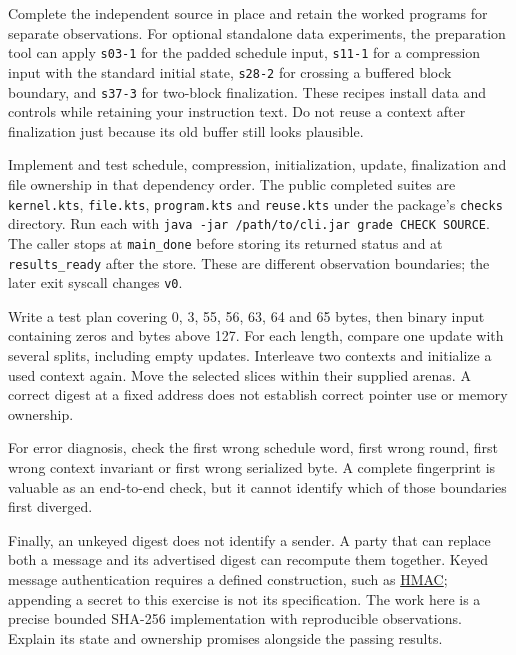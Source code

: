 Complete the independent source in place and retain the worked programs for
separate observations. For optional standalone data experiments, the preparation
tool can apply \texttt{s03-1} for the padded schedule input, \texttt{s11-1} for a
compression input with the standard initial state, \texttt{s28-2} for crossing
a buffered block boundary, and \texttt{s37-3} for two-block finalization.
These recipes install data and controls while retaining your instruction text.
Do not reuse a context after finalization just because its old buffer still
looks plausible.

Implement and test schedule, compression, initialization, update, finalization
and file ownership in that dependency order. The public completed suites are
\texttt{kernel.kts}, \texttt{file.kts}, \texttt{program.kts} and
\texttt{reuse.kts} under the package's \texttt{checks} directory. Run each with
\texttt{java -jar /path/to/cli.jar grade CHECK SOURCE}.
The caller stops at \texttt{main\_done} before storing its returned status and
at \texttt{results\_ready} after the store. These are different observation
boundaries; the later exit syscall changes \texttt{v0}.

Write a test plan covering 0, 3, 55, 56, 63, 64 and 65 bytes, then binary input
containing zeros and bytes above 127. For each length, compare one update with
several splits, including empty updates. Interleave two contexts and initialize
a used context again. Move the selected slices within their supplied arenas.
A correct digest at a fixed address does not establish correct pointer use or
memory ownership.

For error diagnosis, check the first wrong schedule word, first wrong round,
first wrong context invariant or first wrong serialized byte. A complete
fingerprint is valuable as an end-to-end check, but it cannot identify which
of those boundaries first diverged.

Finally, an unkeyed digest does not identify a sender. A party that can replace
both a message and its advertised digest can recompute them together. Keyed
message authentication requires a defined construction, such as \href{https://www.rfc-editor.org/rfc/rfc2104.html}{HMAC}; appending
a secret to this exercise is not its specification. The work here is a precise
bounded SHA-256 implementation with reproducible observations. Explain its
state and ownership promises alongside the passing results.
